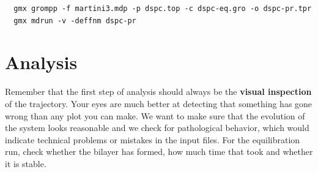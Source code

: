 \begin{verbatim}
  gmx grompp -f martini3.mdp -p dspc.top -c dspc-eq.gro -o dspc-pr.tpr
  gmx mdrun -v -deffnm dspc-pr
\end{verbatim}

\section{Analysis}
Remember that the first step of analysis should always be the \textbf{visual inspection} of the trajectory.
Your eyes are much better at detecting that something has gone wrong than any plot you can make. We want to make sure that the evolution of the system looks reasonable and we check for pathological behavior,
which would indicate technical problems or mistakes in the input files. 
For the equilibration run, check whether the bilayer has formed, how much time that took and whether it is stable. 


